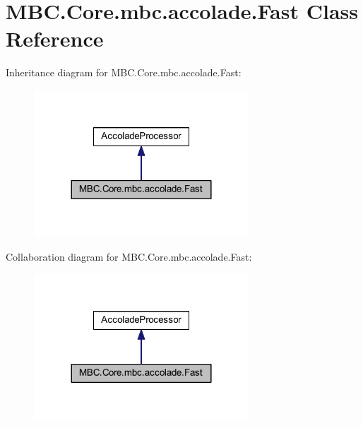 \hypertarget{class_m_b_c_1_1_core_1_1mbc_1_1accolade_1_1_fast}{\section{M\-B\-C.\-Core.\-mbc.\-accolade.\-Fast Class Reference}
\label{class_m_b_c_1_1_core_1_1mbc_1_1accolade_1_1_fast}
}


Inheritance diagram for M\-B\-C.\-Core.\-mbc.\-accolade.\-Fast\-:
\nopagebreak
\begin{figure}[H]
\begin{center}
\leavevmode
\includegraphics[width=228pt]{class_m_b_c_1_1_core_1_1mbc_1_1accolade_1_1_fast__inherit__graph}
\end{center}
\end{figure}


Collaboration diagram for M\-B\-C.\-Core.\-mbc.\-accolade.\-Fast\-:
\nopagebreak
\begin{figure}[H]
\begin{center}
\leavevmode
\includegraphics[width=228pt]{class_m_b_c_1_1_core_1_1mbc_1_1accolade_1_1_fast__coll__graph}
\end{center}
\end{figure}

